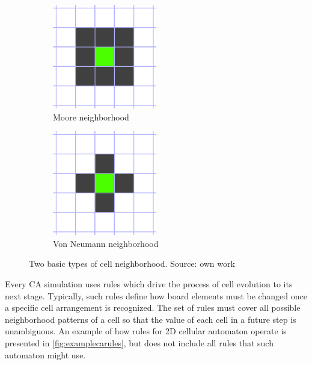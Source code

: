 \documentclass[12pt]{report}
\begin{document}
\begin{figure}[H]
	\centering
	\begin{subfigure}[t]{0.4\textwidth}
		\centering
		\includegraphics[width=0.5\textwidth]{images/neighborsmoore}
		\caption{Moore neighborhood} 
	\end{subfigure} \hspace{1em}
	\hfill
	\begin{subfigure}[t]{0.4\textwidth}
		\centering
		\includegraphics[width=0.5\textwidth]{images/neighborsvonneumann}
		\caption{Von Neumann neighborhood} 
	\end{subfigure} \hspace{1em} 
	\caption{Two basic types of cell neighborhood. Source: own work}
	\label{fig:neighborhood_types}
\end{figure}


Every CA simulation uses rules which drive the process of cell evolution to its next stage. Typically, such rules define how board elements must be changed once a specific cell arrangement is recognized. The set of rules must cover all possible neighborhood patterns of a cell so that the value of each cell in a future step is unambiguous. An example of how rules for 2D cellular automaton operate is presented in \cref{fig:examplecarules}, but does not include all rules that such automaton might use. 
\end{document}
